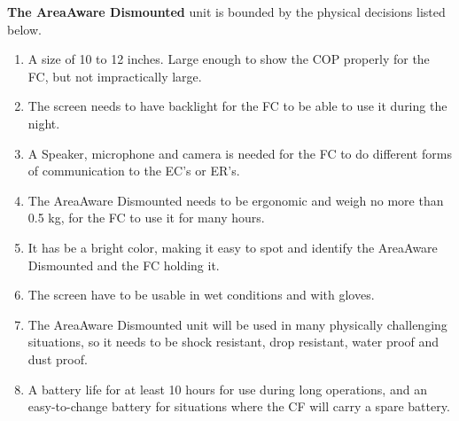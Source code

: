 \noindent \textbf{The AreaAware Dismounted} unit is bounded by the physical decisions listed below.
\begin{enumerate}[label=D-D\arabic*,leftmargin=1.1cm]
  \item A size of 10 to 12 inches. Large enough to show the COP properly for the FC, but not impractically large.
  \item The screen needs to have backlight for the FC to be able to use it during the night.
  \item A Speaker, microphone and camera is needed for the FC to do different forms of communication to the EC's or ER's.
  \item The AreaAware Dismounted needs to be ergonomic and weigh no more than 0.5 kg, for the FC to use it for many hours.
  \item It has be a bright color, making it easy to spot and identify the AreaAware Dismounted and the FC holding it.
  \item The screen have to be usable in wet conditions and with gloves.
  \item The AreaAware Dismounted unit will be used in many physically challenging situations, so it needs to be shock resistant, drop resistant, water proof and dust proof.
  \item A battery life for at least 10 hours for use during long operations, and an easy-to-change battery for situations where the CF will carry a spare battery.
\end{enumerate}